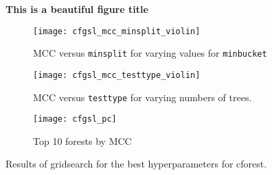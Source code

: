 \begin{figure}[htp]
    \centering
    \textbf{This is a beautiful figure title}\par\medskip
    \begin{subfigure}[b]{.3\textwidth}
        \centering
        \texttt{[image: cfgsl\_mcc\_minsplit\_violin]}
        \cprotect\caption{MCC versus \verb|minsplit| for varying values for \verb|minbucket|}
        \label{fig:cfgsl_mcc_minsplit_violin}
    \end{subfigure}
    \hfill
    \begin{subfigure}[b]{.3\textwidth}
        \centering
        \texttt{[image: cfgsl\_mcc\_testtype\_violin]}
        \cprotect\caption{MCC versus \verb|testtype| for varying numbers of trees.}
        \label{fig:cfgsl_mcc_testtype_violin}
    \end{subfigure}
    \hspace*{\fill}

    \begin{subfigure}[b]{.3\textwidth}
        \centering
        \texttt{[image: cfgsl\_pc]}
        \caption{Top 10 forests by MCC}
        \label{fig:cfgsl_pc}
    \end{subfigure}
\caption{Results of gridsearch for the best hyperparameters for cforest.}
\end{figure}
